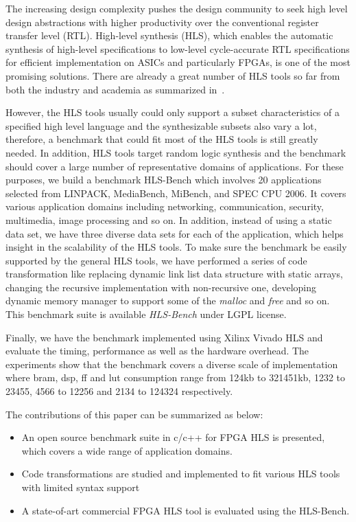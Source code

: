\documentclass[conference]{IEEEtran}
\begin{document}
The increasing design complexity pushes the design community to seek high level design abstractions with higher productivity over the conventional register transfer level (RTL). High-level synthesis (HLS), which enables the automatic synthesis of high-level specifications to low-level cycle-accurate RTL specifications for efficient implementation on ASICs and particularly FPGAs, is one of the most promising solutions. There are already a great number of HLS tools so far from both the industry and academia as summarized in~\cite{martin2009high}. 

However, the HLS tools usually could only support a subset characteristics of a specified high level language and the synthesizable subsets also vary a lot, therefore, a benchmark that could fit most of the HLS tools is still greatly needed. In addition, HLS tools target random logic synthesis and the benchmark should cover a large number of representative domains of applications. For these purposes, we build a benchmark HLS-Bench which involves 20 applications selected from LINPACK, MediaBench, MiBench, and SPEC CPU 2006. It covers various application domains including networking, communication, security, multimedia, image processing and so on. In addition, instead of using a static data set, we have three diverse data sets for each of the application, which helps insight in the scalability of the HLS tools. To make sure the benchmark be easily supported by the general HLS tools, we have performed a series of code transformation like replacing dynamic link list data structure with static arrays, changing the recursive implementation with non-recursive one, developing dynamic memory manager to support some of the \emph{malloc} and \emph{free} and so on. This benchmark suite is available \emph{HLS-Bench} under LGPL license.

Finally, we have the benchmark implemented using Xilinx Vivado HLS and evaluate the timing, performance as well as the hardware overhead. The experiments show that the benchmark covers a diverse scale of implementation where bram, dsp, ff and lut consumption range from 124kb to 321451kb, 1232 to 23455, 4566 to 12256 and 2134 to 124324 respectively.  

The contributions of this paper can be summarized as below:
\begin{itemize}
  \item An open source benchmark suite in c/c++ for FPGA HLS is presented, which covers a wide range of application domains.
  \item Code transformations are studied and implemented to fit various HLS tools with limited syntax support
  \item A state-of-art commercial FPGA HLS tool is evaluated using the HLS-Bench.
\end{itemize}
\end{document}
